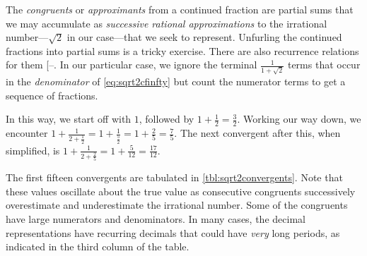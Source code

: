 \documentclass[
  a4paper,
]{article}
\begin{document}
The \emph{congruents} or \emph{approximants} from a continued fraction
are partial sums that we may accumulate as \emph{successive rational
approximations} to the irrational number---\(\sqrt{2}\) in our
case---that we seek to represent. Unfurling the continued fractions into
partial sums is a tricky exercise. There are also recurrence relations
for them {[}--\citeproc{ref-loya2017}{11}{]}.
In our particular case, we ignore the terminal
\(\frac{1}{1 + \sqrt{2}}\) terms that occur in the \emph{denominator} of
\cref{eq:sqrt2cfinfty} but count the numerator terms to get a sequence
of fractions.

In this way, we start off with \(1\), followed by
\(1 + \frac{1}{2} = \frac{3}{2}\). Working our way down, we encounter
\(1 + \frac{1}{2 + \frac{1}{2}} = 1+\frac{1}{\frac{5}{2}} = 1 + \frac{2}{5} = \frac{7}{5}\).
The next convergent after this, when simplified, is
\(1 + \frac{1}{2+\frac{2}{5}} = 1 + \frac{5}{12} = \frac{17}{12}\).

The first fifteen convergents are tabulated in
\cref{tbl:sqrt2convergents}. Note that these values oscillate about the
true value as consecutive congruents successively overestimate and
underestimate the irrational number. Some of the congruents have large
numerators and denominators. In many cases, the decimal representations
have recurring decimals that could have \emph{very} long periods, as
indicated in the third column of the table.
\end{document}
